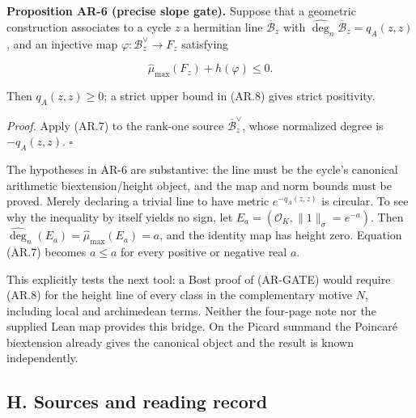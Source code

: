 \textbf{Proposition AR-6 (precise slope gate).} Suppose that a geometric
construction associates to a cycle \(z\) a hermitian line
\(\overline{\mathcal B}_z\) with
\(\widehat{\deg}_n\overline{\mathcal B}_z=q_A(z,z)\), and an injective
map \(\varphi:\mathcal B_z^\vee\to F_z\) satisfying

\[
\widehat\mu_{\max}(F_z)+h(\varphi)\le0.
\tag{AR.8}
\]

Then \(q_A(z,z)\ge0\); a strict upper bound in (AR.8) gives strict
positivity.

\emph{Proof.} Apply (AR.7) to the rank-one source
\(\overline{\mathcal B}_z^\vee\), whose normalized degree is
\(-q_A(z,z)\). \(\square\)

The hypotheses in AR-6 are substantive: the line must be the cycle's
canonical arithmetic biextension/height object, and the map and norm
bounds must be proved. Merely declaring a trivial line to have metric
\(e^{-q_A(z,z)}\) is circular. To see why the inequality by itself
yields no sign, let \(E_a=(\mathcal O_K,\|1\|_\sigma=e^{-a})\). Then
\(\widehat{\deg}_n(E_a)=\widehat\mu_{\max}(E_a)=a\), and the identity
map has height zero. Equation (AR.7) becomes \(a\le a\) for every
positive or negative real \(a\).

This explicitly tests the next tool: a Bost proof of (AR-GATE) would
require (AR.8) for the height line of every class in the complementary
motive \(N\), including local and archimedean terms. Neither the
four-page note nor the supplied Lean map provides this bridge. On the
Picard summand the Poincaré biextension already gives the canonical
object and the result is known independently.

\subsection{H. Sources and reading
record}\label{h.-sources-and-reading-record}

